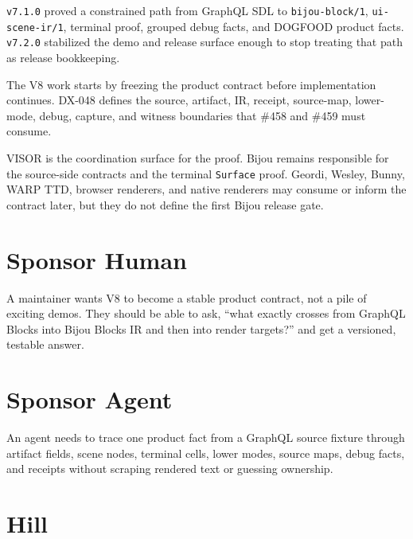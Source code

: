 \texttt{v\allowbreak{}7\allowbreak{}.\allowbreak{}1\allowbreak{}.\allowbreak{}0} proved a constrained path from GraphQL SDL to \texttt{b\allowbreak{}i\allowbreak{}j\allowbreak{}o\allowbreak{}u\allowbreak{}-\allowbreak{}b\allowbreak{}l\allowbreak{}o\allowbreak{}c\allowbreak{}k\allowbreak{}/\allowbreak{}1}, \texttt{u\allowbreak{}i\allowbreak{}-\allowbreak{}s\allowbreak{}c\allowbreak{}e\allowbreak{}n\allowbreak{}e\allowbreak{}-\allowbreak{}i\allowbreak{}r\allowbreak{}/\allowbreak{}1}, terminal proof, grouped debug facts, and DOGFOOD product facts. \texttt{v\allowbreak{}7\allowbreak{}.\allowbreak{}2\allowbreak{}.\allowbreak{}0} stabilized the demo and release surface enough to stop treating that path as release bookkeeping.

The V8 work starts by freezing the product contract before implementation continues. DX-048 defines the source, artifact, IR, receipt, source-map, lower-mode, debug, capture, and witness boundaries that \#458 and \#459 must consume.

VISOR is the coordination surface for the proof. Bijou remains responsible for the source-side contracts and the terminal \texttt{S\allowbreak{}u\allowbreak{}r\allowbreak{}f\allowbreak{}a\allowbreak{}c\allowbreak{}e} proof. Geordi, Wesley, Bunny, WARP TTD, browser renderers, and native renderers may consume or inform the contract later, but they do not define the first Bijou release gate.

\section{Sponsor Human}\label{record-144-sponsor-human}

A maintainer wants V8 to become a stable product contract, not a pile of exciting demos. They should be able to ask, ``what exactly crosses from GraphQL Blocks into Bijou Blocks IR and then into render targets?'' and get a versioned, testable answer.

\section{Sponsor Agent}\label{record-144-sponsor-agent}

An agent needs to trace one product fact from a GraphQL source fixture through artifact fields, scene nodes, terminal cells, lower modes, source maps, debug facts, and receipts without scraping rendered text or guessing ownership.

\section{Hill}\label{record-144-hill}

